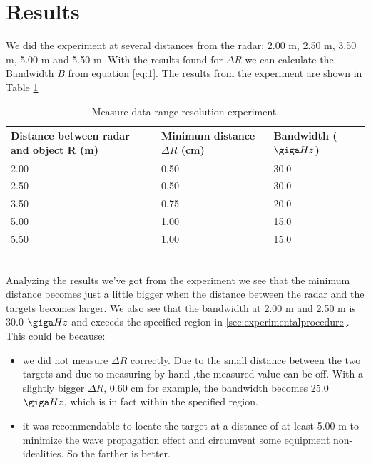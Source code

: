 \documentclass[final]{scrreprt} %
\begin{document}
\section{Results}
We did the experiment at several distances from the radar: 2.00 \unit{m}, 2.50 \unit{m}, 3.50 \unit{m}, 5.00 \unit{m} and 5.50 \unit{m}. 
With the results found for $\Delta R$ we can calculate the Bandwidth $B$ from equation \ref{eq:1}.
The results from the experiment are shown in Table \ref{tab:2}
\begin{table}[h]
\begin{center}
\begin{tabular}{ | l | l | l | }
    \hline
    Distance between radar and object R (m) & Minimum distance $\Delta R$ (cm) & Bandwidth ($\giga Hz$)  \\\hline
    2.00 & 0.50 & 30.0 \\\hline
    2.50 & 0.50 & 30.0 \\\hline
    3.50 & 0.75 & 20.0  \\\hline
    5.00 & 1.00 & 15.0  \\\hline
    5.50 & 1.00 & 15.0  \\\hline
\end{tabular}
\caption{Measure data range resolution experiment.}
\label{tab:2}
\end{center}
\end{table}
\\


Analyzing the results we've got from the experiment we see that the minimum distance becomes just a little bigger when the distance between the radar and the targets becomes larger.
We also see that the bandwidth at 2.00 \unit{m} and 2.50 \unit{m} is 30.0 $\giga Hz$ and exceeds the specified region in \ref{sec:experimentalprocedure}.
This could be because:
\begin{itemize}
\item we did not measure $\Delta R$ correctly. 
Due to the small distance between the two targets and due to measuring by hand ,the measured value can be off. 
With a slightly bigger $\Delta R$, 0.60 \unit{\centi m} for example, the bandwidth becomes  25.0 $\giga Hz$,  which is in fact within the specified region.
\item it was recommendable to locate the target at a distance of at least 5.00 \unit{m} to minimize the wave propagation effect and circumvent some equipment non-idealities.
 So the farther is better.
\end{itemize}
\end{document}
